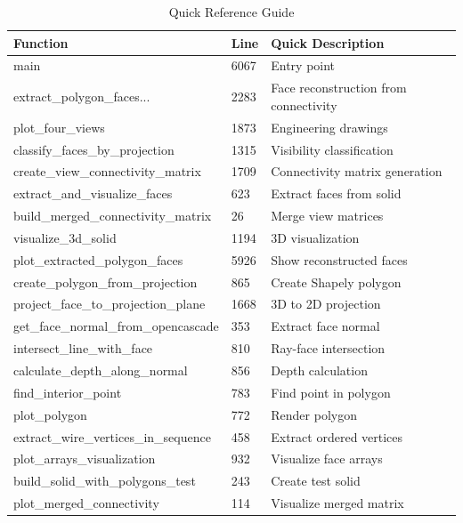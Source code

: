 \documentclass[11pt,a4paper]{article}
\begin{document}
\begin{table}[htbp]
\centering
\small
\begin{tabular}{p{4cm}p{1.5cm}p{5cm}}
\toprule
\textbf{Function} & \textbf{Line} & \textbf{Quick Description} \\
\midrule
main & 6067 & Entry point \\
extract\_polygon\_faces... & 2283 & Face reconstruction from connectivity \\
plot\_four\_views & 1873 & Engineering drawings \\
classify\_faces\_by\_projection & 1315 & Visibility classification \\
create\_view\_connectivity\_matrix & 1709 & Connectivity matrix generation \\
extract\_and\_visualize\_faces & 623 & Extract faces from solid \\
build\_merged\_connectivity\_matrix & 26 & Merge view matrices \\
visualize\_3d\_solid & 1194 & 3D visualization \\
plot\_extracted\_polygon\_faces & 5926 & Show reconstructed faces \\
create\_polygon\_from\_projection & 865 & Create Shapely polygon \\
project\_face\_to\_projection\_plane & 1668 & 3D to 2D projection \\
get\_face\_normal\_from\_opencascade & 353 & Extract face normal \\
intersect\_line\_with\_face & 810 & Ray-face intersection \\
calculate\_depth\_along\_normal & 856 & Depth calculation \\
find\_interior\_point & 783 & Find point in polygon \\
plot\_polygon & 772 & Render polygon \\
extract\_wire\_vertices\_in\_sequence & 458 & Extract ordered vertices \\
plot\_arrays\_visualization & 932 & Visualize face arrays \\
build\_solid\_with\_polygons\_test & 243 & Create test solid \\
plot\_merged\_connectivity & 114 & Visualize merged matrix \\
\bottomrule
\end{tabular}
\caption{Quick Reference Guide}
\end{table}
\end{document}
